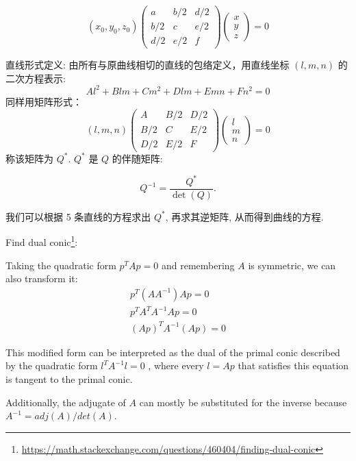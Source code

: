 \[
  (x_0,y_0,z_0) \begin{pmatrix} a & b/2 & d/2 \\ b/2 & c & e/2 \\ d/2 & e/2 & f \end{pmatrix} \begin{pmatrix} x \\ y \\ z \end{pmatrix} = 0
\]


直线形式定义: 由所有与原曲线相切的直线的包络定义，用直线坐标 \( (l, m, n) \) 的二次方程表示:
  \[
  Al^2 + Blm + Cm^2 + Dlm + Emn + Fn^2 = 0
  \]
同样用矩阵形式：
  \[
  (l, m, n) \begin{pmatrix} A & B/2 & D/2 \\ B/2 & C & E/2 \\ D/2 & E/2 & F \end{pmatrix} \begin{pmatrix} l \\ m \\ n \end{pmatrix} = 0
  \]
称该矩阵为 $Q^*$. $Q^*$ 是 $Q$ 的伴随矩阵:

\[
  Q^{-1} = \dfrac{Q^*}{\det(Q)}.
\]

我们可以根据 5 条直线的方程求出 $Q^*$, 再求其逆矩阵, 从而得到曲线的方程.

Find dual conic\footnote{\url{https://math.stackexchange.com/questions/460404/finding-dual-conic}}:

Taking the quadratic form $p^TAp=0$ and remembering $A$ 
is symmetric, we can also transform it:
\begin{gather*}
  p^T(AA^{-1})Ap=0 \\
  p^TA^TA^{-1}Ap=0 \\
  (Ap)^TA^{-1}(Ap)=0 
\end{gather*}

This modified form can be interpreted as the dual of the primal conic described by the quadratic form $l^𝑇𝐴^{−1}l=0$
, where every $l=Ap$ that satisfies this equation is tangent to the primal conic.

Additionally, the adjugate of $A$ can mostly be substituted for the inverse because $A^{-1}=adj(A)/det(A)$.